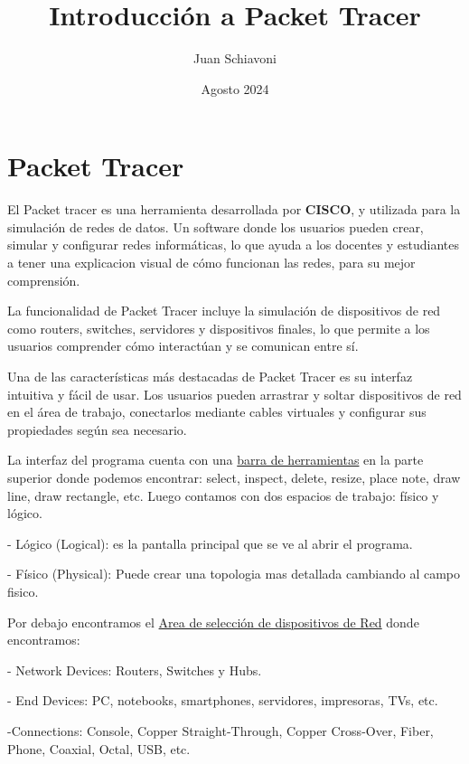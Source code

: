 \documentclass{article}
\title{Introducción a Packet Tracer}
\author{Juan Schiavoni}
\date{Agosto 2024}
\begin{document}
\maketitle

\section{Packet Tracer}
El Packet tracer es una herramienta desarrollada por \textbf{CISCO}, y utilizada para la simulación de redes de datos. Un software donde los usuarios pueden crear, simular y configurar redes informáticas, lo que ayuda a los docentes y estudiantes a tener una explicacion visual de cómo funcionan las redes, para su mejor comprensión.

La funcionalidad de Packet Tracer incluye la simulación de dispositivos de red como routers, switches, servidores y dispositivos finales, lo que permite a los usuarios comprender cómo interactúan y se comunican entre sí.

Una de las características más destacadas de Packet Tracer es su interfaz intuitiva y fácil de usar. Los usuarios pueden arrastrar y soltar dispositivos de red en el área de trabajo, conectarlos mediante cables virtuales y configurar sus propiedades según sea necesario.

\vspace{10pt}

La interfaz del programa cuenta con una \underline{barra de herramientas} en la parte superior donde podemos encontrar: select, inspect, delete, resize, place note, draw line, draw rectangle, etc. Luego contamos con dos espacios de trabajo: físico y lógico.

- Lógico (Logical): es la pantalla principal que se ve al abrir el programa.

- Físico (Physical): Puede crear una topologia mas detallada cambiando al campo fisico.

\vspace{10pt}

Por debajo encontramos el \underline{Area de selección de dispositivos de Red} donde encontramos:

- Network Devices: Routers, Switches y Hubs.

- End Devices: PC, notebooks, smartphones, servidores, impresoras, TVs, etc.

-Connections: Console, Copper Straight-Through, Copper Cross-Over, Fiber, Phone, Coaxial, Octal, USB, etc.

\vspace{10pt}
\end{document}
